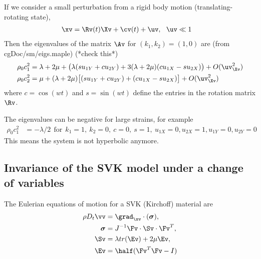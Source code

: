 If we consider a small perturbation from a rigid body motion (translating-rotating state),
\begin{align}
 \xv &= \Rv(t) \Xv + \cv(t) + \uv , ~~ \uv \ll 1 
\end{align}
Then the eigenvalues of the matrix $\Av$ for $(k_1,k_2)=(1,0)$ are (from cgDoc/sm/eigs.maple) (*check this*)
\newcommand{\uX}{{u_{1X}}}
\newcommand{\vX}{{u_{2X}}}
\newcommand{\uY}{{u_{1Y}}}
\newcommand{\vY}{{u_{2Y}}}
\begin{align}
 \rho_0 c_1^2 &= \lambda + 2 \mu + \big(\lambda( s \uY + c \vY) 
                  + 3 (\lambda +2\mu)(c \uX-s\vX)  \big) +O( \uv_\Xv^2 ) \\
 \rho_0 c_2^2 &= \mu + (\lambda+2\mu)\big[ (s \uY + c \vY) + (c\uX - s\vX) \big] +O( \uv_\Xv^2  )
\end{align}
where $c=\cos(w t)$ and $s=\sin(w t)$ define the entries in the rotation matrix $\Rv$. 

The eigenvalues can be negative for large strains, for example
\begin{align}
 \rho_0 c_1^2 &= -\lambda/2 ~~\text{for}~~ k_1=1,~k_2=0,~c=0,~s=1,~\uX=0,\vX=1,\uY=0,\vY=0
\end{align}
This means the system is not hyperbolic anymore.



\subsection{Invariance of the SVK model under a change of variables}


The Eulerian equations of motion for a SVK (Kirchoff) material are 
\begin{align}
  \rho D_t \vv &= \grad_{\xv}\cdot( \sigmav)   ,\\
  \sigmav &= J^{-1} \Fv\cdot\Sv\cdot\Fv^{T}, \\
  \Sv &= \lambda tr(\Ev) + 2\mu \Ev , \\
   \Ev & = \half( \Fv^T \Fv - I)  
\end{align}

